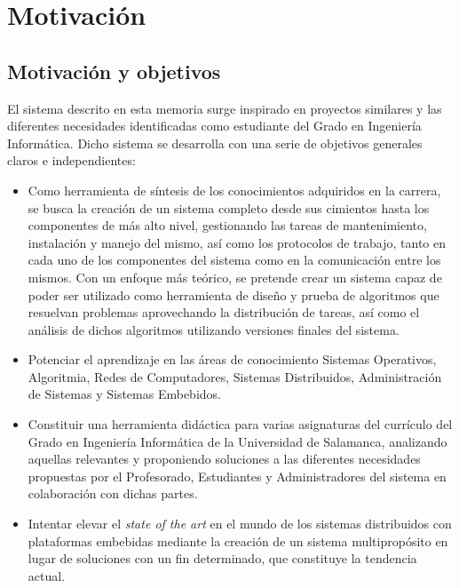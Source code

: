 \chapter{Motivación}

\section{Motivación y objetivos}

El sistema descrito en esta memoria surge inspirado en proyectos similares y las diferentes necesidades identificadas como estudiante del Grado en Ingeniería Informática. Dicho sistema se desarrolla con una serie de objetivos generales claros e independientes:

\begin{itemize}
	\item Como herramienta de síntesis de los conocimientos adquiridos en la carrera, se busca la creación de un sistema completo desde sus cimientos hasta los componentes de más alto nivel, gestionando las tareas de mantenimiento, instalación y manejo del mismo, así como los protocolos de trabajo, tanto en cada uno de los componentes del sistema como en la comunicación entre los mismos. Con un enfoque más teórico, se pretende crear un sistema capaz de poder ser utilizado como herramienta de diseño y prueba de algoritmos que resuelvan problemas aprovechando la distribución de tareas, así como el análisis de dichos algoritmos utilizando versiones finales del sistema.

	\item Potenciar el aprendizaje en las áreas de conocimiento Sistemas Operativos, Algoritmia, Redes de Computadores, Sistemas Distribuidos, Administración de Sistemas y Sistemas Embebidos.
	
	\item Constituir una herramienta didáctica para varias asignaturas del currículo del Grado en Ingeniería Informática de la Universidad de Salamanca, analizando aquellas relevantes y proponiendo soluciones a las diferentes necesidades propuestas por el Profesorado, Estudiantes y Administradores del sistema en colaboración con dichas partes.

	\item Intentar elevar el \textit{state of the art} en el mundo de los sistemas distribuidos con plataformas embebidas mediante la creación de un sistema multipropósito en lugar de soluciones con un fin determinado, que constituye la tendencia actual.
\end{itemize}


